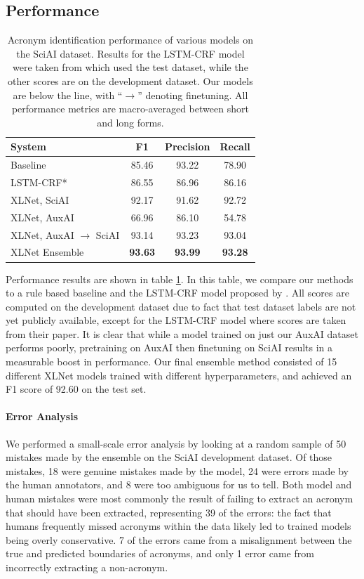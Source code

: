 \documentclass[letterpaper]{article} %
\begin{document}
\subsection{Performance}
\begin{table}[ht]
\centering
\begin{tabular}{@{}lccc@{}}
\toprule
\textbf{System} & \textbf{F1} & \textbf{Precision} & \textbf{Recall} \\ \midrule
Baseline & 85.46 & 93.22 & 78.90 \\
LSTM-CRF* & 86.55 & 86.96 & 86.16 \\ \midrule
XLNet, SciAI & 92.17 & 91.62 & 92.72 \\
XLNet, AuxAI & 66.96 & 86.10 & 54.78 \\
XLNet, AuxAI $\rightarrow$ SciAI & 93.14 & 93.23 & 93.04 \\
XLNet Ensemble & \textbf{93.63} & \textbf{93.99} & \textbf{93.28} \\ \bottomrule
\end{tabular}
\caption{Acronym identification performance of various models on the SciAI dataset. Results for the LSTM-CRF model were taken from \citeauthor{veyseh-et-al-2020-what} which used the test dataset, while the other scores are on the development dataset. Our models are below the line, with ``$\rightarrow$'' denoting finetuning. All performance metrics are macro-averaged between short and long forms.}
\label{tab:ai-results}
\end{table}

Performance results are shown in table \ref{tab:ai-results}. In this table, we compare our methods to a rule based baseline \cite{ai-baseline} and the LSTM-CRF model proposed by \citeauthor{veyseh-et-al-2020-what}. All scores are computed on the development dataset due to fact that test dataset labels are not yet publicly available, except for the LSTM-CRF model where scores are taken from their paper. It is clear that while a model trained on just our AuxAI dataset performs poorly, pretraining on AuxAI then finetuning on SciAI results in a measurable boost in performance. Our final ensemble method consisted of 15 different XLNet models trained with different hyperparameters, and achieved an F1 score of 92.60 on the test set.

\paragraph*{Error Analysis}
We performed a small-scale error analysis by looking at a random sample of 50 mistakes made by the ensemble on the SciAI development dataset. Of those mistakes, 18 were genuine mistakes made by the model, 24 were errors made by the human annotators, and 8 were too ambiguous for us to tell. Both model and human mistakes were most commonly the result of failing to extract an acronym that should have been extracted, representing 39 of the errors: the fact that humans frequently missed acronyms within the data likely led to trained models being overly conservative. 7 of the errors came from a misalignment between the true and predicted boundaries of acronyms, and only 1 error came from incorrectly extracting a non-acronym.
\end{document}
